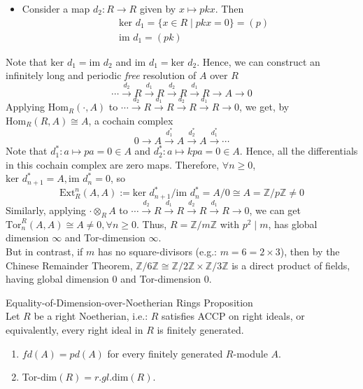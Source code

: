 \begin{itemize}
\begin{itemize}
        \item Consider a map $d_2: R\to R$ given by $x\mapsto pkx$. Then
        \begin{align*}
            &\text{ker }d_1= \{x\in R\mid pkx=0\}=(p)\\
            &\text{im }d_1=(pk)
        \end{align*}
    \end{itemize}
    Note that $\text{ker }d_1=\text{im }d_2$ and $ \text{im }d_1= \text{ker }d_2$. Hence, we can construct an infinitely long and periodic \textit{free} resolution of $A$ over $R$
    \[
    \cdots \xrightarrow{d_2}R \xrightarrow{d_1} R\xrightarrow{d_2}R \xrightarrow{d_1} R\to A\to0
    \]
    Applying $\text{Hom}_R(\cdot, A)$ to $\cdots \xrightarrow{d_2}R \xrightarrow{d_1} R\xrightarrow{d_2}R \xrightarrow{d_1} R\to0$, we get, by $\text{Hom}_R(R,A) \cong A$, a cochain complex
    \[
    0\to A\xrightarrow{d_1^*} A\xrightarrow{d_2^*} A\xrightarrow{d_1^*}\cdots
    \]
    Note that $d_1^*: a\mapsto pa=0\in A$ and $d_2^*:a \mapsto kpa=0\in A$. Hence, all the differentials in this cochain complex are zero maps. Therefore, $\forall n\geq 0$, $\text{ker }d_{n+1}^*=A, \text{im }d_n^*=0$, so
    \[
    \text{Ext}_R^n (A,A):= \text{ker }d_{n+1}^*/ \text{im }d_n^*= A/0\cong A=\mathbb{Z}/p \mathbb{Z}\neq 0
    \]
    Similarly, applying $\cdot \otimes _RA$ to $\cdots \xrightarrow{d_2}R \xrightarrow{d_1} R\xrightarrow{d_2}R \xrightarrow{d_1} R\to0$, we can get $\text{Tor}_n^R (A,A) \cong A\neq 0 ,\forall n\geq 0$. Thus, $R=\mathbb{Z}/ m\mathbb{Z}$ with $p^2\mid m$, has global dimension $\infty$ and Tor-dimension $\infty$.\\
    But in contrast, if $m$ has no square-divisors (e.g.: $m=6=2\times 3$), then by the Chinese Remainder Theorem, $\mathbb{Z}/ 6\mathbb{Z} \cong \mathbb{Z}/ 2\mathbb{Z} \times \mathbb{Z}/ 3\mathbb{Z}$ is a direct product of fields, having global dimension $0$ and Tor-dimension $0$.
\end{itemize}

\begin{proposition}{Equality-of-Dimension-over-Noetherian Rings Proposition}\\
Let $R$ be a right Noetherian, i.e.: $R$ satisfies ACCP on right ideals, or equivalently, every right ideal in $R$ is finitely generated.
\begin{enumerate}
    \item $fd(A)=pd(A)$ for every finitely generated $R$-module $A$.
    \item Tor-$\text{dim}(R)=r.gl.\text{dim} (R)$.
\end{enumerate}
\end{proposition}

